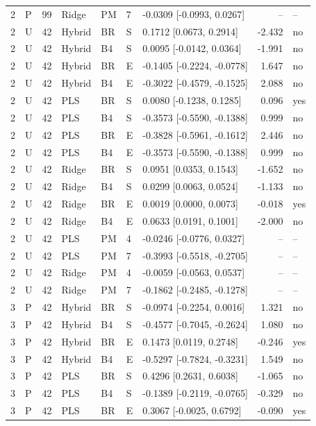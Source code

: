 \documentclass[10pt,a4paper]{article}
\begin{document}
\begin{landscape}
\begin{longtable}{rlrllllrl}
2 & P & 99 & Ridge & PM & 7 & -0.0309 [-0.0993, 0.0267] & -- & -- \\
2 & U & 42 & Hybrid & BR & S & 0.1712 [0.0673, 0.2914] & -2.432 & no \\
2 & U & 42 & Hybrid & B4 & S & 0.0095 [-0.0142, 0.0364] & -1.991 & no \\
2 & U & 42 & Hybrid & BR & E & -0.1405 [-0.2224, -0.0778] & 1.647 & no \\
2 & U & 42 & Hybrid & B4 & E & -0.3022 [-0.4579, -0.1525] & 2.088 & no \\
2 & U & 42 & PLS & BR & S & 0.0080 [-0.1238, 0.1285] & 0.096 & yes \\
2 & U & 42 & PLS & B4 & S & -0.3573 [-0.5590, -0.1388] & 0.999 & no \\
2 & U & 42 & PLS & BR & E & -0.3828 [-0.5961, -0.1612] & 2.446 & no \\
2 & U & 42 & PLS & B4 & E & -0.3573 [-0.5590, -0.1388] & 0.999 & no \\
2 & U & 42 & Ridge & BR & S & 0.0951 [0.0353, 0.1543] & -1.652 & no \\
2 & U & 42 & Ridge & B4 & S & 0.0299 [0.0063, 0.0524] & -1.133 & no \\
2 & U & 42 & Ridge & BR & E & 0.0019 [0.0000, 0.0073] & -0.018 & yes \\
2 & U & 42 & Ridge & B4 & E & 0.0633 [0.0191, 0.1001] & -2.000 & no \\
2 & U & 42 & PLS & PM & 4 & -0.0246 [-0.0776, 0.0327] & -- & -- \\
2 & U & 42 & PLS & PM & 7 & -0.3993 [-0.5518, -0.2705] & -- & -- \\
2 & U & 42 & Ridge & PM & 4 & -0.0059 [-0.0563, 0.0537] & -- & -- \\
2 & U & 42 & Ridge & PM & 7 & -0.1862 [-0.2485, -0.1278] & -- & -- \\
3 & P & 42 & Hybrid & BR & S & -0.0974 [-0.2254, 0.0016] & 1.321 & no \\
3 & P & 42 & Hybrid & B4 & S & -0.4577 [-0.7045, -0.2624] & 1.080 & no \\
3 & P & 42 & Hybrid & BR & E & 0.1473 [0.0119, 0.2748] & -0.246 & yes \\
3 & P & 42 & Hybrid & B4 & E & -0.5297 [-0.7824, -0.3231] & 1.549 & no \\
3 & P & 42 & PLS & BR & S & 0.4296 [0.2631, 0.6038] & -1.065 & no \\
3 & P & 42 & PLS & B4 & S & -0.1389 [-0.2119, -0.0765] & -0.329 & no \\
3 & P & 42 & PLS & BR & E & 0.3067 [-0.0025, 0.6792] & -0.090 & yes \\

\end{longtable}
\end{landscape}
\end{document}

